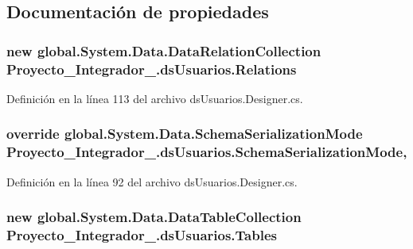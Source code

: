 \subsection{Documentación de propiedades}
\hypertarget{class_proyecto___integrador__3_1_1ds_usuarios_ac1a722fbe5919c3d98ef3cc923978cec}{
\subsubsection[{Relations}]{\setlength{\rightskip}{0pt plus 5cm}new global.\-System.\-Data.\-Data\-Relation\-Collection Proyecto\-\_\-\-Integrador\-\_.\-ds\-Usuarios.\-Relations\hspace{0.3cm}{\ttfamily [get]}}}\label{class_proyecto___integrador__3_1_1ds_usuarios_ac1a722fbe5919c3d98ef3cc923978cec}


Definición en la línea 113 del archivo ds\-Usuarios.\-Designer.\-cs.

\hypertarget{class_proyecto___integrador__3_1_1ds_usuarios_aed33539fcaa97590918e8ab6153de8ba}{
\subsubsection[{Schema\-Serialization\-Mode}]{\setlength{\rightskip}{0pt plus 5cm}override global.\-System.\-Data.\-Schema\-Serialization\-Mode Proyecto\-\_\-\-Integrador\-\_.\-ds\-Usuarios.\-Schema\-Serialization\-Mode\hspace{0.3cm}{\ttfamily [get]}, {\ttfamily [set]}}}\label{class_proyecto___integrador__3_1_1ds_usuarios_aed33539fcaa97590918e8ab6153de8ba}


Definición en la línea 92 del archivo ds\-Usuarios.\-Designer.\-cs.

\hypertarget{class_proyecto___integrador__3_1_1ds_usuarios_a5a3e80b30906b3389a7282cdf5dd621c}{
\subsubsection[{Tables}]{\setlength{\rightskip}{0pt plus 5cm}new global.\-System.\-Data.\-Data\-Table\-Collection Proyecto\-\_\-\-Integrador\-\_.\-ds\-Usuarios.\-Tables\hspace{0.3cm}{\ttfamily [get]}}}\label{class_proyecto___integrador__3_1_1ds_usuarios_a5a3e80b30906b3389a7282cdf5dd621c}


